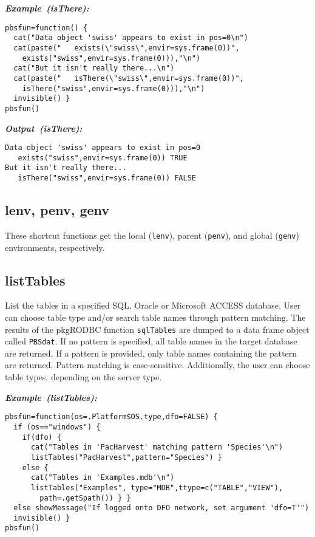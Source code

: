 \documentclass[letterpaper,12pt,fleqn]{article}
\def\tab{\hspace{0.5 in}}
\newcommand{\code}[1]{\small\texttt{#1}\normalsize}
\newcommand\example[1]{    %
	\textbf{\emph{Example~(#1):}}\\ \vspace{3 pt}
}
\newcommand\results[1]{    %
	\textbf{\emph{Output~(#1):}}\\ \vspace{3 pt}
}
\begin{document}
\begin{examplebox}
\example{isThere}
\begin{Verbatim}[fontsize=\footnotesize]
pbsfun=function() {
  cat("Data object 'swiss' appears to exist in pos=0\n")
  cat(paste("   exists(\"swiss\",envir=sys.frame(0))",
    exists("swiss",envir=sys.frame(0))),"\n")
  cat("But it isn't really there...\n")
  cat(paste("   isThere(\"swiss\",envir=sys.frame(0))",
    isThere("swiss",envir=sys.frame(0))),"\n")
  invisible() }
pbsfun()
\end{Verbatim}
\end{examplebox}

\begin{outputbox}
\results{isThere}
\begin{Verbatim}[fontsize=\footnotesize]
Data object 'swiss' appears to exist in pos=0
   exists("swiss",envir=sys.frame(0)) TRUE 
But it isn't really there...
   isThere("swiss",envir=sys.frame(0)) FALSE
\end{Verbatim}
\end{outputbox}

\subsection {lenv, penv, genv}

\tab These shortcut functions get the local (\code{lenv}), parent (\code{penv}), and global (\code{genv}) environments, respectively.

\subsection {listTables}

\tab List the tables in a specified SQL, Oracle or Microsoft ACCESS database. User can choose table type and/or search table names through pattern matching. The results of the pkg{RODBC} function \code{sqlTables} are dumped to a data frame object called \code{PBSdat}. If no pattern is specified, all table names in the target database are returned. If a pattern is provided, only table names containing the pattern are returned. Pattern matching is case-sensitive. Additionally, the user can choose table types, depending on the server type.

\begin{examplebox}
\example{listTables}
\begin{Verbatim}[fontsize=\footnotesize]
pbsfun=function(os=.Platform$OS.type,dfo=FALSE) {
  if (os=="windows") {
    if(dfo) {
      cat("Tables in 'PacHarvest' matching pattern 'Species'\n")
      listTables("PacHarvest",pattern="Species") }
    else {
      cat("Tables in 'Examples.mdb'\n")
      listTables("Examples", type="MDB",ttype=c("TABLE","VIEW"),
        path=.getSpath()) } }
  else showMessage("If logged onto DFO network, set argument 'dfo=T'")
  invisible() }
pbsfun()
\end{Verbatim}
\end{examplebox}
\end{document}
